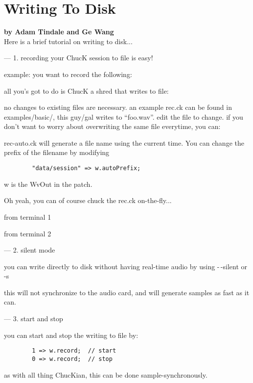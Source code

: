 \section{Writing To Disk}
\textbf{by Adam Tindale and Ge Wang}\\

Here is a brief tutorial on writing to disk...

---
1. recording your ChucK session to file is easy!

example:  you want to record the following:


all you's got to do is ChucK a shred that writes to file:


no changes to existing files are necessary.
an example rec.ck can be found in examples/basic/, this
guy/gal writes to ``foo.wav''.  edit the file to change.
if you don't want to worry about overwriting the same
file everytime, you can:


rec-auto.ck will generate a file name using the current
time.  You can change the prefix of the filename by modifying
\begin{verbatim}
        "data/session" => w.autoPrefix;
\end{verbatim}
w is the WvOut in the patch.

Oh yeah, you can of course chuck the rec.ck on-the-fly...

from terminal 1

from terminal 2


---
2. silent mode

you can write directly to disk without having real-time audio
by using -\,-silent or -s


this will not synchronize to the audio card, and will generate
samples as fast as it can.


---
3. start and stop

you can start and stop the writing to file by:
\begin{verbatim}
        1 => w.record;  // start
        0 => w.record;  // stop
\end{verbatim}
as with all thing ChucKian, this can be done
sample-synchronously.


